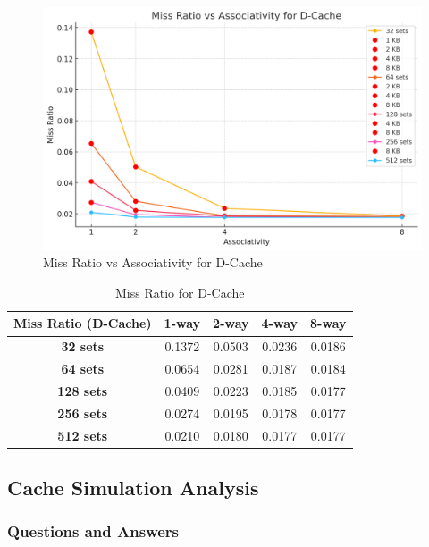 \documentclass{article}
\begin{document}
\begin{figure}[H]
	\centering
	\includegraphics[width=\linewidth]{dcache.png}
	\caption{Miss Ratio vs Associativity for D-Cache}
	\label{fig:dcache}
\end{figure}


\begin{table}[h]
	\centering
	\begin{tabular}{|c|c|c|c|c|}
		\hline
		\textbf{Miss Ratio (D-Cache)} & \textbf{1-way} & \textbf{2-way} & \textbf{4-way} & \textbf{8-way} \\ \hline
		\textbf{32 sets}  &       0.1372    &     0.0503       &        0.0236      &     0.0186        \\ \hline
		\textbf{64 sets}  &      0.0654       &      0.0281       &     0.0187       &       0.0184      \\ \hline
		\textbf{128 sets} &      0.0409       &       0.0223      &      0.0185       &      0.0177       \\ \hline
		\textbf{256 sets} &       0.0274      &      0.0195       &      0.0178       &      0.0177        \\ \hline
		\textbf{512 sets} &      0.0210       &      0.0180       &      0.0177       &     0.0177        \\ \hline
	\end{tabular}
	\caption{Miss Ratio for D-Cache}
	\label{tab:D-Cache}
\end{table}

\subsection{Cache Simulation Analysis}

\subsubsection{Questions and Answers}
\end{document}
